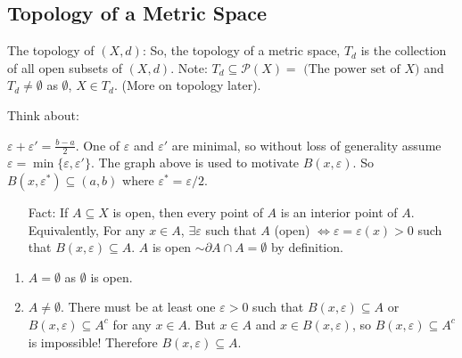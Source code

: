 \documentclass[10pt]{article}
\begin{document}
\subsection{Topology of a Metric Space}
The topology of $(X,d)$: So, the topology of a metric space, $T_{d}$ is the collection of all open subsets of $(X,d)$. Note: $T_{d}\subseteq\mathcal{P}(X)=\text{ (The power set of $X$)}$ and $T_{d}\neq\emptyset$ as $\emptyset$, $X\in T_{d}$. (More on topology later).

Think about:
\begin{center}
\end{center}
$\varepsilon+\varepsilon'=\frac{b-a}{2}$. One of $\varepsilon$ and $\varepsilon'$ are minimal, so without loss of generality assume $\varepsilon=\min\{\varepsilon,\varepsilon'\}$. The graph above is used to motivate $B(x,\varepsilon)$. So $B(x,\varepsilon^{*})\subseteq(a,b)$ where $\varepsilon^{*}=\varepsilon/2$.
\begin{itemize}
    \item[Fact:] If $A\subseteq X$ is open, then every point of $A$ is an interior point of $A$. Equivalently, For any $x\in A$, $\exists\varepsilon$ such that $A$ (open) $\iff\varepsilon=\varepsilon(x)>0$ such that $B(x,\varepsilon)\subseteq A$. $A$ is open $\sim\partial A\cap A=\emptyset$ by definition.
\end{itemize}
\begin{enumerate}
    \item $A=\emptyset$ as $\emptyset$ is open.
    \item $A\neq\emptyset$. There must be at least one $\varepsilon>0$ such that $B(x,\varepsilon)\subseteq A$ or $B(x,\varepsilon)\subseteq A^{c}$ for any $x\in A$. But $x\in A$ and $x\in B(x,\varepsilon)$, so $B(x,\varepsilon)\subseteq A^{c}$ is impossible! Therefore $B(x,\varepsilon)\subseteq A$.
\end{enumerate}
\end{document}
